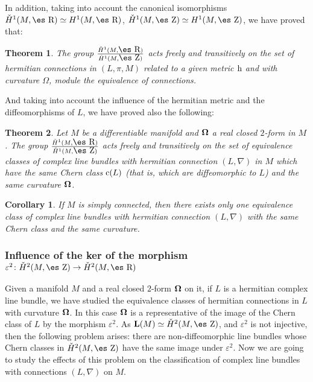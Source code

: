 \documentclass[12pt]{article}
\newtheorem{teor}{Theorem}
\newtheorem{corol}{Corollary}
\def\dst{\(}
\def\h{{\rm h}}
\def\curv{{\bf \Omega}}
\def\Zahl{\mbox{\es Z}}
\def\Real{\mbox{\es R}}
\begin{document}
In addition, taking into account the canonical isomorphisms
$\check H^1(M,\Real ) \simeq H^1(M,\Real )$,
$\check H^1(M,\Zahl ) \simeq H^1(M,\Zahl )$,
we have proved that:

\begin{teor}
The group
\dst\frac{\check H^1(M,\Real )}{\check H^1(M,\Zahl )}\)
acts freely and transitively on the set of hermitian connections in
$(L,\pi ,M)$ related to a given metric $\h$
and with curvature $\Omega$, module the equivalence of connections.
\end{teor}

And taking into account the influence of the hermitian metric
and the diffeomorphisms of $L$,
we have proved also the following:

\begin{teor}
Let $M$ be a differentiable manifold and
$\curv$ a real closed $2$-form in $M$. The group
\dst\frac{\check H^1(M,\Real )}{\check H^1(M,\Zahl )}\)
acts freely and transitively on the set of equivalence classes
of complex line bundles with hermitian connection
$(L,\nabla )$ in $M$
which have the same Chern class ${\rm c}(L)$
(that is, which are diffeomorphic to $L$)
and the same curvature $\curv$.
\end{teor}

\begin{corol}
If $M$ is simply connected,
then there exists only one equivalence class
of complex line bundles with hermitian connection $(L,\nabla )$
with the same Chern class and the same curvature.
\end{corol}


\subsubsection{Influence of the ker of the morphism
$\varepsilon^2 \colon \check H^2(M,\Zahl ) \to \check H^2(M,\Real )$}


Given a manifold $M$ and a real closed $2$-form $\curv$ on it,
if $L$ is a hermitian complex line bundle, we have studied
the equivalence classes of hermitian connections in $L$
with curvature $\curv$. In this case $\curv$
is a representative of the image of the Chern class
of $L$ by the morphism $\varepsilon^2$.
As ${\bf L}(M) \simeq \check H^2(M,\Zahl )$,
and $\varepsilon^2$ is not injective,
then the following problem arises:
there are non-diffeomorphic line bundles whose Chern classes
in $\check H^2(M,\Zahl )$ have the same image under $\varepsilon^2$.
Now we are going to study the effects of this problem
on the classification of complex line bundles
with connections $(L,\nabla )$ on $M$.
\end{document}
